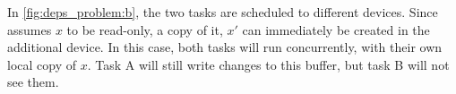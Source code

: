 \documentclass[main.tex]{subfiles}
\begin{document}
In \cref{fig:deps_problem:b}, the two tasks are scheduled to different devices. Since \starpu assumes $x$ to be read-only, a copy of it, $x'$ can immediately be created in the additional device. In this case, both tasks will run concurrently, with their own local copy of $x$. Task A will still write changes to this buffer, but task B will not see them.
\end{document}
